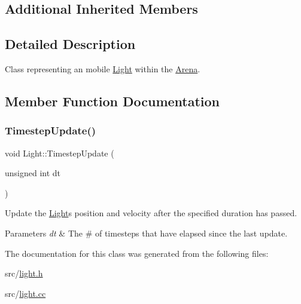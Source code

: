 \subsection*{Additional Inherited Members}


\subsection{Detailed Description}
Class representing an mobile \mbox{\hyperlink{class_light}{Light}} within the \mbox{\hyperlink{class_arena}{Arena}}. 

\subsection{Member Function Documentation}
\mbox{\label{class_light_a97934eec7489f9b072534f5e30a2d90d}} 
\subsubsection{\texorpdfstring{Timestep\+Update()}{TimestepUpdate()}}
{\footnotesize\ttfamily void Light\+::\+Timestep\+Update (\begin{DoxyParamCaption}\item[{unsigned int}]{dt }\end{DoxyParamCaption})\hspace{0.3cm}{\ttfamily [override]}}



Update the \mbox{\hyperlink{class_light}{Light}}\textquotesingle{}s position and velocity after the specified duration has passed. 


\begin{DoxyParams}{Parameters}
{\em dt} & The \# of timesteps that have elapsed since the last update. \\
\hline
\end{DoxyParams}


The documentation for this class was generated from the following files\+:\begin{DoxyCompactItemize}
\item 
src/\mbox{\hyperlink{light_8h}{light.\+h}}\item 
src/\mbox{\hyperlink{light_8cc}{light.\+cc}}\end{DoxyCompactItemize}
